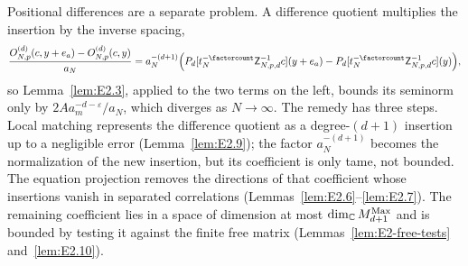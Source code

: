 Positional differences are a separate problem. A difference quotient multiplies the insertion by the inverse spacing,
\begin{equation}\label{eq:E-inverse-spacing}
\frac{O^{(d)}_{N,p}(c,y+e_a)-O^{(d)}_{N,p}(c,y)}{a_N}
=a_N^{-(d+1)}\Bigl(P_d[t_N^{-\factorcount}\mathsf Z_{N,p,d}^{-1}c](y+e_a)
-P_d[t_N^{-\factorcount}\mathsf Z_{N,p,d}^{-1}c](y)\Bigr),
\end{equation}
so Lemma~\ref{lem:E2.3}, applied to the two terms on the left, bounds its seminorm only by $2Aa_m^{-d-\varepsilon}/a_N$, which diverges as $N\to\infty$. The remedy has three steps. Local matching represents the difference quotient as a degree-$(d+1)$ insertion up to a negligible error (Lemma~\ref{lem:E2.9}); the factor $a_N^{-(d+1)}$ becomes the normalization of the new insertion, but its coefficient is only tame, not bounded. The equation projection removes the directions of that coefficient whose insertions vanish in separated correlations (Lemmas~\ref{lem:E2.6}--\ref{lem:E2.7}). The remaining coefficient lies in a space of dimension at most $\dim_{\mathbb{C}}M_{d+1}^{\mathrm{Max}}$ and is bounded by testing it against the finite free matrix (Lemmas~\ref{lem:E2-free-tests} and~\ref{lem:E2.10}).


